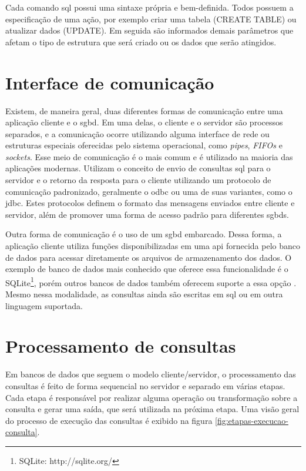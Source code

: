 Cada comando \gls{sql} possui uma sintaxe própria e bem-definida. Todos possuem a especificação de uma ação, por exemplo criar uma tabela (CREATE TABLE) ou atualizar dados (UPDATE). Em seguida são informados demais parâmetros que afetam o tipo de estrutura que será criado ou os dados que serão atingidos.



\section{Interface de comunicação}
\label{interface-comunicacao}

Existem, de maneira geral, duas diferentes formas de comunicação entre uma aplicação cliente e o \gls{sgbd}. Em uma delas, o cliente e o servidor são processos separados, e a comunicação ocorre utilizando alguma interface de rede ou estruturas especiais oferecidas pelo sistema operacional, como \emph{pipes}, \emph{FIFOs} e \emph{sockets}. Esse meio de comunicação é o mais comum e é utilizado na maioria das aplicações modernas. Utilizam o conceito de envio de consultas \gls{sql} para o servidor e o retorno da resposta para o cliente utilizando um protocolo de comunicação padronizado, geralmente o \gls{odbc} ou uma de suas variantes, como o \gls{jdbc}. Estes protocolos definem o formato das mensagens enviados entre cliente e servidor, além de promover uma forma de acesso padrão para diferentes \glspl{sgbd}.

Outra forma de comunicação é o uso de um \gls{sgbd} embarcado. Dessa forma, a aplicação cliente utiliza funções disponibilizadas em uma \gls{api} fornecida pelo banco de dados para acessar diretamente os arquivos de armazenamento dos dados. O exemplo de banco de dados mais conhecido que oferece essa funcionalidade é o SQLite\footnote{SQLite: http://sqlite.org/}, porém outros bancos de dados também oferecem suporte a essa opção \cite[p. 195]{Bell:2012}. Mesmo nessa modalidade, as consultas ainda são escritas em \gls{sql} ou em outra linguagem suportada.



\section{Processamento de consultas}
\label{processamento-consultas}

Em bancos de dados que seguem o modelo cliente/servidor, o processamento das consultas é feito de forma sequencial no servidor e separado em várias etapas. Cada etapa é responsável por realizar alguma operação ou transformação sobre a consulta e gerar uma saída, que será utilizada na próxima etapa. Uma visão geral do processo de execução das consultas é exibido na figura \ref{fig:etapas-execucao-consulta}.

